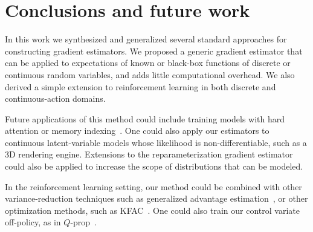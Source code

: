 \documentclass{article}
\begin{document}


\section{Conclusions and future work}
\label{conclusion}
In this work we synthesized and generalized several standard approaches for constructing gradient estimators.
We proposed a generic gradient estimator that can be applied to expectations of known or black-box functions of discrete or continuous random variables, and adds little computational overhead.
We also derived a simple extension to reinforcement learning in both discrete and continuous-action domains. 


Future applications of this method could include training models with hard attention or memory indexing~\citep{zaremba2015reinforcement}.
One could also apply our estimators to continuous latent-variable models whose likelihood is non-differentiable, such as a 3D rendering engine.
Extensions to the reparameterization gradient estimator~\citep{ruiz2016generalized, naesseth2017reparameterization} could also be applied to increase the scope of distributions that can be modeled. 
%

 In the reinforcement learning setting, our method could be combined with other variance-reduction techniques such as generalized advantage estimation~\citep{kimura2000analysis, schulman2015high}, or other optimization methods, such as KFAC~\citep{wu2017scalable}.
One could also train our control variate off-policy, as in $Q$-prop~\citep{gu2016q}.
\end{document}
